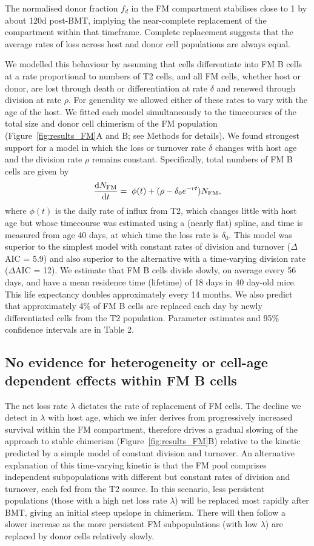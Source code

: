\documentclass[11pt]{article}
\newcommand{\ddt}[1]{\ensuremath{\frac{{\rm d}#1}{{\rm d}t}}}  %
\newcommand{\be}{\begin{equation}}
\newcommand{\ee}{\end{equation}}
\begin{document}
The normalised donor fraction $f_{d}$ in the FM compartment stabilises close to 1 by about 120d post-BMT,  implying the near-complete replacement of the compartment within that timeframe. Complete replacement suggests that the average rates of loss across host and donor cell populations are always equal.

We modelled this behaviour by assuming that cells differentiate into FM B cells at a rate proportional to numbers of T2 cells, and all FM cells, whether host or donor, are lost through death or differentiation  at rate $\delta$ and renewed through division  at rate $\rho$. For generality we allowed either of these rates to vary with the age of the host. We fitted each model  simultaneously to the timecourses of the total size and donor cell chimerism of the FM population (Figure~\ref{fig:results_FM}A and B; see Methods for details). We found strongest support for a model in which the loss or turnover rate $\delta$ changes with host age and the division rate $\rho$ remains constant. Specifically, total numbers of FM B cells are given by
\be
\ddt{N_\text{FM}} = \;  \phi(t) + (\rho - \delta_{0}e^{-rt}) N_\text{FM},
\ee
where $\phi(t)$ is the daily rate of influx from T2, which changes little with host age but whose timecourse was estimated using a (nearly flat) spline,  and time is measured from age 40 days, at which time the loss rate is $\delta_{0}$. This model was superior to the simplest model with constant rates of division and turnover ($\Delta$AIC = 5.9) and also superior to the alternative with a time-varying division rate ($\Delta$AIC = 12). We estimate that FM B cells divide slowly, on average every 56 days,  and have a mean residence time (lifetime) of 18 days in 40 day-old mice. This life expectancy doubles approximately every 14 months. We also predict that approximately 4\% of FM B cells are replaced each day by newly differentiated cells from the T2 population. Parameter estimates and 95\% confidence intervals are in Table 2.

\subsection*{No evidence for  heterogeneity or cell-age dependent effects within FM B cells}

The net loss rate $\lambda$ dictates the rate of replacement of FM cells. The decline we detect in $\lambda$ with host age, which we infer derives from progressively increased survival within the FM compartment,  therefore drives  a gradual slowing of the approach to stable chimerism (Figure~\ref{fig:results_FM}B) relative to the kinetic predicted by a simple model of constant division and turnover. An alternative explanation of this time-varying kinetic is that the FM pool comprises independent subpopulations with different but constant rates of division and turnover, each fed from the T2 source.  In this scenario, less persistent populations (those with a high net loss rate $\lambda$) will be replaced most rapidly after BMT, giving an initial steep upslope in chimerism. There will then follow a slower increase as the more persistent  FM subpopulations (with low $\lambda$) are replaced by donor cells relatively slowly.
\end{document}
